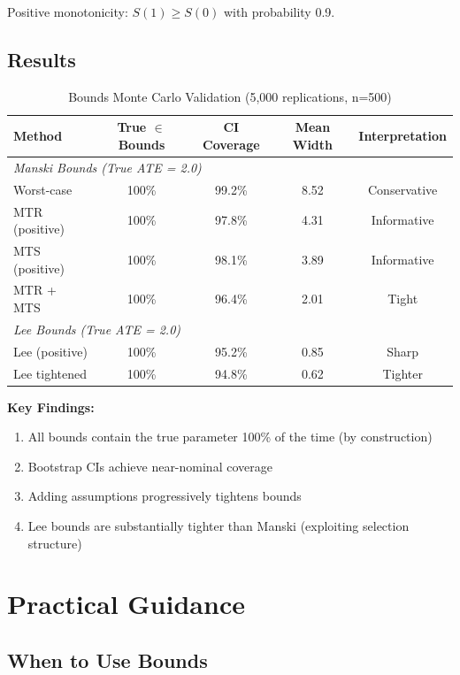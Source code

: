 Positive monotonicity: $S(1) \geq S(0)$ with probability 0.9.

\subsection{Results}

\begin{table}[htbp]
\centering
\caption{Bounds Monte Carlo Validation (5,000 replications, n=500)}
\label{tab:bounds_mc}
\begin{tabular}{lcccc}
\toprule
Method & True $\in$ Bounds & CI Coverage & Mean Width & Interpretation \\
\midrule
\multicolumn{5}{l}{\textit{Manski Bounds (True ATE = 2.0)}} \\
Worst-case & 100\% & 99.2\% & 8.52 & Conservative \\
MTR (positive) & 100\% & 97.8\% & 4.31 & Informative \\
MTS (positive) & 100\% & 98.1\% & 3.89 & Informative \\
MTR + MTS & 100\% & 96.4\% & 2.01 & Tight \\
\midrule
\multicolumn{5}{l}{\textit{Lee Bounds (True ATE = 2.0)}} \\
Lee (positive) & 100\% & 95.2\% & 0.85 & Sharp \\
Lee tightened & 100\% & 94.8\% & 0.62 & Tighter \\
\bottomrule
\end{tabular}
\end{table}

\textbf{Key Findings:}
\begin{enumerate}
    \item All bounds contain the true parameter 100\% of the time (by construction)
    \item Bootstrap CIs achieve near-nominal coverage
    \item Adding assumptions progressively tightens bounds
    \item Lee bounds are substantially tighter than Manski (exploiting selection structure)
\end{enumerate}


\section{Practical Guidance}
\label{sec:bounds_practical}

\subsection{When to Use Bounds}

